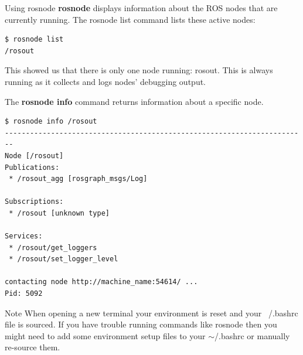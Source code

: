 \begin{frame}{Using rosnode}
\textbf{rosnode} displays information about the ROS nodes that are currently running. The rosnode list command lists these active nodes: 
\begin{lstlisting}[language=shell]
$ rosnode list
/rosout
\end{lstlisting}
This showed us that there is only one node running: rosout. This is always running as it collects and logs nodes' debugging output. 

\vspace{.1cm}
The \textbf{rosnode info} command returns information about a specific node. 
\begin{lstlisting}[language=shell]
$ rosnode info /rosout
------------------------------------------------------------------------
Node [/rosout]
Publications:
 * /rosout_agg [rosgraph_msgs/Log]

Subscriptions:
 * /rosout [unknown type]

Services:
 * /rosout/get_loggers
 * /rosout/set_logger_level

contacting node http://machine_name:54614/ ...
Pid: 5092
\end{lstlisting}

\begin{alertblock}{Note}
When opening a new terminal your environment is reset and your ~/.bashrc file is sourced. If you have trouble running commands like rosnode then you might need to add some environment setup files to your $\sim$/.bashrc or manually re-source them. 
\end{alertblock}
\end{frame}


